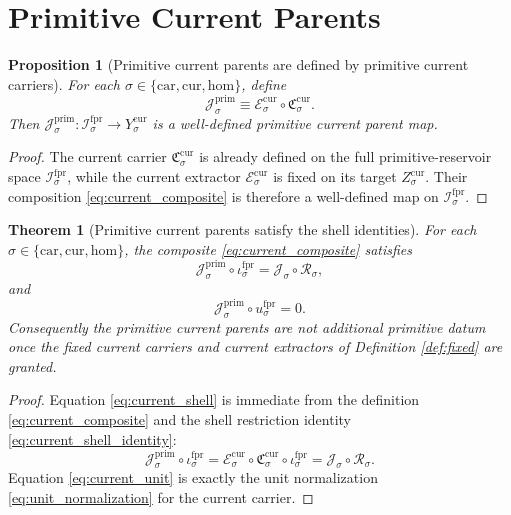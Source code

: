 \documentclass[11pt]{article}
\newcommand{\Car}{\mathrm{car}}
\newcommand{\Cur}{\mathrm{cur}}
\newcommand{\Hom}{\mathrm{hom}}
\newcommand{\ForPrimSpace}[1]{\mathcal I_{#1}^{\mathrm{fpr}}}
\newcommand{\ForPrimInc}[1]{\iota_{#1}^{\mathrm{fpr}}}
\newcommand{\ForPrimUnit}[1]{u_{#1}^{\mathrm{fpr}}}
\newcommand{\Reduction}[1]{\mathcal R_{#1}}
\newcommand{\ObsCurrent}[1]{\mathcal J_{#1}}
\newcommand{\PrimCurrent}[1]{\mathcal J_{#1}^{\mathrm{prim}}}
\newcommand{\CurrentCarrier}[1]{\mathfrak C_{#1}^{\mathrm{cur}}}
\newcommand{\CurrentExtract}[1]{\mathscr E_{#1}^{\mathrm{cur}}}
\newtheorem{proposition}{Proposition}
\newtheorem{theorem}{Theorem}
\begin{document}
\section{Primitive Current Parents}

\begin{proposition}[Primitive current parents are defined by primitive current carriers]
\label{prop:currentdef}
For each \(\sigma\in\{\Car,\Cur,\Hom\}\), define
\begin{equation}
\PrimCurrent{\sigma}
\equiv
\CurrentExtract{\sigma}\circ \CurrentCarrier{\sigma}.
\label{eq:current_composite}
\end{equation}
Then \(\PrimCurrent{\sigma}:\ForPrimSpace{\sigma}\to Y_{\sigma}^{\mathrm{cur}}\) is a well-defined primitive current parent map.
\end{proposition}

\begin{proof}
The current carrier \(\CurrentCarrier{\sigma}\) is already defined on the full primitive-reservoir space \(\ForPrimSpace{\sigma}\), while the current extractor \(\CurrentExtract{\sigma}\) is fixed on its target \(Z_{\sigma}^{\mathrm{cur}}\). Their composition \eqref{eq:current_composite} is therefore a well-defined map on \(\ForPrimSpace{\sigma}\).
\end{proof}

\begin{theorem}[Primitive current parents satisfy the shell identities]
\label{thm:current}
For each \(\sigma\in\{\Car,\Cur,\Hom\}\), the composite \eqref{eq:current_composite} satisfies
\begin{equation}
\PrimCurrent{\sigma}\circ \ForPrimInc{\sigma}
=
\ObsCurrent{\sigma}\circ \Reduction{\sigma},
\label{eq:current_shell}
\end{equation}
and
\begin{equation}
\PrimCurrent{\sigma}\circ \ForPrimUnit{\sigma}=0.
\label{eq:current_unit}
\end{equation}
Consequently the primitive current parents are not additional primitive datum once the fixed current carriers and current extractors of Definition \ref{def:fixed} are granted.
\end{theorem}

\begin{proof}
Equation \eqref{eq:current_shell} is immediate from the definition \eqref{eq:current_composite} and the shell restriction identity \eqref{eq:current_shell_identity}:
\[
\PrimCurrent{\sigma}\circ \ForPrimInc{\sigma}
=
\CurrentExtract{\sigma}\circ \CurrentCarrier{\sigma}\circ \ForPrimInc{\sigma}
=
\ObsCurrent{\sigma}\circ \Reduction{\sigma}.
\]
Equation \eqref{eq:current_unit} is exactly the unit normalization \eqref{eq:unit_normalization} for the current carrier.
\end{proof}
\end{document}

